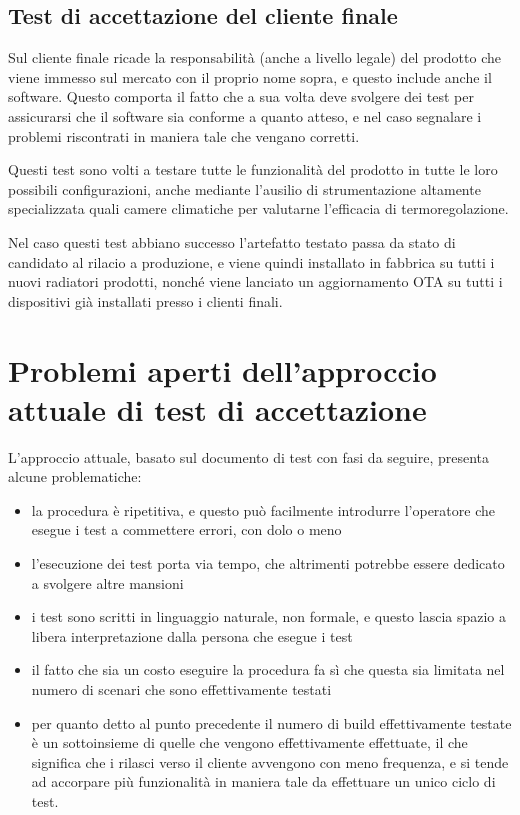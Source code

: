 \documentclass[12pt,a4paper,twoside,titlepage]{book}
\begin{document}
\subsection{Test di accettazione del cliente finale}

Sul cliente finale ricade la responsabilità (anche a livello legale) del prodotto
che viene immesso sul mercato con il proprio nome sopra, e questo include anche
il software. Questo comporta il fatto che a sua volta deve svolgere dei test per
assicurarsi che il software sia conforme a quanto atteso, e nel caso segnalare i
problemi riscontrati in maniera tale che vengano corretti.

Questi test sono volti a testare tutte le funzionalità del prodotto in tutte le loro
possibili configurazioni, anche mediante l'ausilio di strumentazione altamente
specializzata quali camere climatiche per valutarne l'efficacia di termoregolazione.

Nel caso questi test abbiano successo l'artefatto testato passa da stato di candidato
al rilacio a produzione, e viene quindi installato in fabbrica su tutti i nuovi radiatori
prodotti, nonché viene lanciato un aggiornamento OTA su tutti i dispositivi già installati
presso i clienti finali.

\section{Problemi aperti dell'approccio attuale di test di accettazione}

L'approccio attuale, basato sul documento di test con fasi da seguire, presenta
alcune problematiche:
\begin{itemize}
    \item la procedura è ripetitiva, e questo può facilmente introdurre
        l'operatore che esegue i test a commettere errori, con dolo o meno
    \item l'esecuzione dei test porta via tempo, che altrimenti potrebbe essere dedicato
        a svolgere altre mansioni
    \item i test sono scritti in linguaggio naturale, non formale, e questo lascia spazio
        a libera interpretazione dalla persona che esegue i test
    \item il fatto che sia un costo eseguire la procedura fa sì che questa sia
        limitata nel numero di scenari che sono effettivamente testati
    \item per quanto detto al punto precedente il numero di build effettivamente testate
        è un sottoinsieme di quelle che vengono effettivamente effettuate, il che significa che
        i rilasci verso il cliente avvengono con meno frequenza, e si tende ad accorpare
        più funzionalità in maniera tale da effettuare un unico ciclo di test.
\end{itemize}
\end{document}
